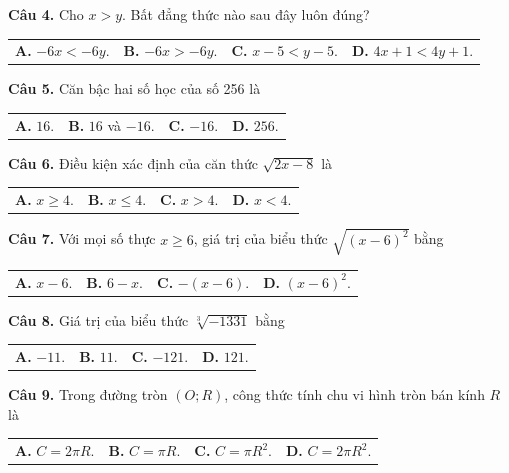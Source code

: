 \documentclass[11pt,a4paper]{article}
\begin{document}
\vspace{1.5mm}
\textbf{Câu 4.} Cho $x > y$. Bất đẳng thức nào sau đây luôn đúng?\\
\begin{tabularx}{\linewidth}{XXXX}
\textbf{A.} $-6x < -6y$. & \textbf{B.} $-6x > -6y$. & \textbf{C.} $x - 5 < y - 5$. & \textbf{D.} $4x + 1 < 4y + 1$.
\end{tabularx}

\vspace{1.5mm}
\textbf{Câu 5.} Căn bậc hai số học của số 256 là\\
\begin{tabularx}{\linewidth}{XXXX}
\textbf{A.} $16$. & \textbf{B.} $16$ và $-16$. & \textbf{C.} $-16$. & \textbf{D.} $256$.
\end{tabularx}

\vspace{1.5mm}
\textbf{Câu 6.} Điều kiện xác định của căn thức $\sqrt{2x - 8}$ là\\
\begin{tabularx}{\linewidth}{XXXX}
\textbf{A.} $x \ge 4$. & \textbf{B.} $x \le 4$. & \textbf{C.} $x > 4$. & \textbf{D.} $x < 4$.
\end{tabularx}

\vspace{1.5mm}
\textbf{Câu 7.} Với mọi số thực $x \ge 6$, giá trị của biểu thức $\sqrt{(x-6)^2}$ bằng\\
\begin{tabularx}{\linewidth}{XXXX}
\textbf{A.} $x - 6$. & \textbf{B.} $6 - x$. & \textbf{C.} $-(x-6)$. & \textbf{D.} $(x-6)^2$.
\end{tabularx}

\vspace{1.5mm}
\textbf{Câu 8.} Giá trị của biểu thức $\sqrt[3]{-1331}$ bằng\\
\begin{tabularx}{\linewidth}{XXXX}
\textbf{A.} $-11$. & \textbf{B.} $11$. & \textbf{C.} $-121$. & \textbf{D.} $121$.
\end{tabularx}

\vspace{1.5mm}
\textbf{Câu 9.} Trong đường tròn $(O; R)$, công thức tính chu vi hình tròn bán kính $R$ là\\
\begin{tabularx}{\linewidth}{XXXX}
\textbf{A.} $C = 2\pi R$. & \textbf{B.} $C = \pi R$. & \textbf{C.} $C = \pi R^2$. & \textbf{D.} $C = 2\pi R^2$.
\end{tabularx}
\end{document}
